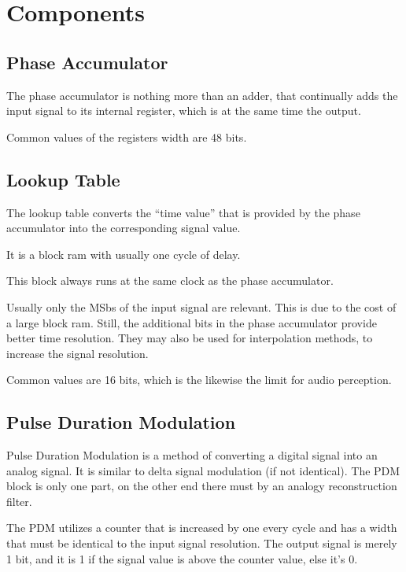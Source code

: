 \documentclass{article}
\begin{document}
\section{Components}

\subsection{Phase Accumulator}

The phase accumulator is nothing more than an adder, that continually adds the
input signal to its internal register, which is at the same time the output.

Common values of the registers width are 48 bits.



\subsection{Lookup Table}

The lookup table converts the “time value” that is provided by the phase
accumulator into the corresponding signal value.

It is a block ram with usually one cycle of delay.

This block always runs at the same clock as the phase accumulator.

Usually only the MSbs of the input signal are relevant. This is due to the cost
of a large block ram. Still, the additional bits in the phase accumulator
provide better time resolution. They may also be used for interpolation
methods, to increase the signal resolution.

Common values are 16 bits, which is the likewise the limit for audio perception.



\subsection{Pulse Duration Modulation}

Pulse Duration Modulation is a method of converting a digital signal into an
analog signal. It is similar to delta signal modulation (if not identical). The
PDM block is only one part, on the other end there must by an analogy
reconstruction filter.

The PDM utilizes a counter that is increased by one every cycle and has a width
that must be identical to the input signal resolution. The output signal is
merely 1 bit, and it is 1 if the signal value is above the counter value, else
it's 0. 
\end{document}
